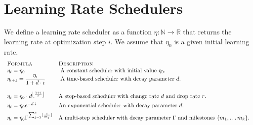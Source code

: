 \documentclass{article}
\newcommand{\set}[1]{\ensuremath{\{ #1 \} }} %
\newcommand{\Reals}{\mathbb{R}}
\begin{document}
\section{Learning Rate Schedulers} \label{section:learning-rate-schedulers}
We define a learning rate scheduler as a function $\eta: \mathbb{N} \rightarrow \Reals$ that returns the learning rate at optimization step $i$. We assume that $\eta_0$ is a given initial learning rate.
\[
\begin{array}{lll} %
\textsc{Formula} & \textsc{Description} 
\\
  \eta_{i}= \eta_0 
  & \text{ A constant scheduler with initial value $\eta_0$. }
\\
  \eta_{i+1} = \displaystyle \frac {\eta_{i}}{1+d \cdot i} 
  & \text{ A time-based scheduler with decay parameter $d$. } 
\\
\\
  \eta_{i} = \displaystyle \eta_{0} \cdot d^{ \left \lfloor {\frac {1+i}{r}} \right \rfloor } 
  & \text{A step-based scheduler with change rate $d$ and drop rate $r$. } 
\\
\addlinespace[1ex]
  \eta_{i} = \eta_{0} e^{-d \cdot i} 
  & \text{An exponential scheduler with decay parameter $d$.}
\\   
\addlinespace[1ex]
  \eta_{i} = \displaystyle \eta_{0} \Gamma^{\sum_{j=1}^k \lfloor \frac{i}{m_j} \rfloor}
  & \text{A multi-step scheduler with decay parameter $\Gamma$ and milestones $\set{m_1, \ldots m_k}$.}
\end{array}
\]

\clearpage



\appendix

\clearpage
\end{document}
